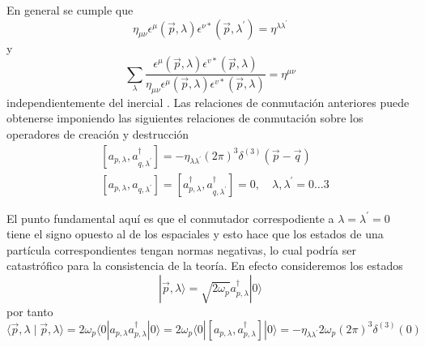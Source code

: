 En general se cumple que
\begin{equation*}
\eta_{\mu \nu} \epsilon^{\mu}(\vec{p}, \lambda) \epsilon^{\nu *}\left(\vec{p}, \lambda^{\prime}\right)=\eta^{\lambda \lambda^{\prime}} \tag{6.56}
\end{equation*}
y
\begin{equation*}
\sum_{\lambda} \frac{\epsilon^{\mu}(\vec{p}, \lambda) \epsilon^{v *}(\vec{p}, \lambda)}{\eta_{\mu \nu} \epsilon^{\mu}(\vec{p}, \lambda) \epsilon^{v *}(\vec{p}, \lambda)}=\eta^{\mu \nu} \tag{6.57}
\end{equation*}
independientemente del inercial .
Las relaciones de conmutación anteriores puede obtenerse imponiendo las siguientes relaciones de conmutación sobre los operadores de creación y destrucción
$$
\begin{align*}
& {\left[a_{p, \lambda}, a_{q, \lambda^{\prime}}^{\dagger}\right]=-\eta_{\lambda \lambda^{\prime}}(2 \pi)^{3} \delta^{(3)}(\vec{p}-\vec{q})}  \tag{6.59}\\
& {\left[a_{p, \lambda}, a_{q, \lambda^{\prime}}\right]=\left[a_{p, \lambda}^{\dagger}, a_{q, \lambda^{\prime}}^{\dagger}\right]=0, \quad \lambda, \lambda^{\prime}=0 \ldots 3} \tag{6.60}
\end{align*}
$$

El punto fundamental aquí es que el conmutador correspodiente a $\lambda=\lambda^{\prime}=0$ tiene el signo opuesto al de los espaciales y esto hace que los estados de una partícula correspondientes tengan normas negativas, lo cual podría ser catastrófico para la consistencia de la teoría. En efecto consideremos los estados
\begin{equation*}
|\vec{p}, \lambda\rangle=\sqrt{2 \omega_{p}} a_{p, \lambda}^{\dagger}|0\rangle \tag{6.61}
\end{equation*}
por tanto
\begin{equation*}
\langle\vec{p}, \lambda \mid \vec{p}, \lambda\rangle=2 \omega_{p}\langle 0| a_{p, \lambda} a_{p, \lambda}^{\dagger}|0\rangle=2 \omega_{p}\langle 0|\left[a_{p, \lambda}, a_{p, \lambda}^{\dagger}\right]|0\rangle=-\eta_{\lambda \lambda^{\prime}} 2 \omega_{p}(2 \pi)^{3} \delta^{(3)}(0) \tag{6.62}
\end{equation*}

